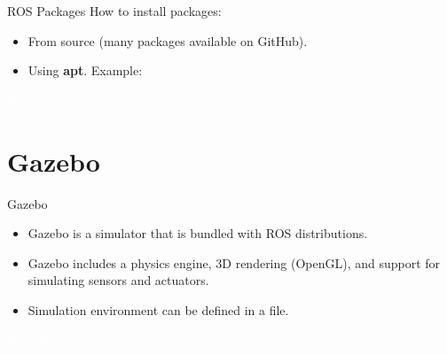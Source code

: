 \documentclass{beamer}
\begin{document}
\begin{frame}{ROS Packages}  
	How to install packages:
	\vspace{0.5cm}
    \begin{itemize}
	\item From source (many packages available on GitHub).
		\vspace{0.5cm}
	\item Using \textbf{apt}. Example:
		\vspace{0.5cm}
		 \begin{terminal}
			\color{green} 
		\end{terminal}
\end{itemize}  
\end{frame}

\begin{frame}[plain]{}  
	\centering
	{\huge \textcolor{white}{Demo} }
	\linebreak
	{\textcolor{white}{package, rosrun, launch files} }
\end{frame}

\section{Gazebo}
\begin{frame}{Gazebo}  

	\begin{itemize}
		\item Gazebo is a simulator that is bundled with ROS distributions.
		\vspace{0.5cm}
		\item Gazebo includes a physics engine, 3D rendering (OpenGL), and support for simulating sensors and actuators.
		\vspace{0.5cm}
		\item Simulation environment can be defined in a  file.
	\end{itemize}  
\end{frame}

\begin{frame}[plain]{}  
	\centering
	{\huge \textcolor{white}{Example} }
\end{frame}
\end{document}
